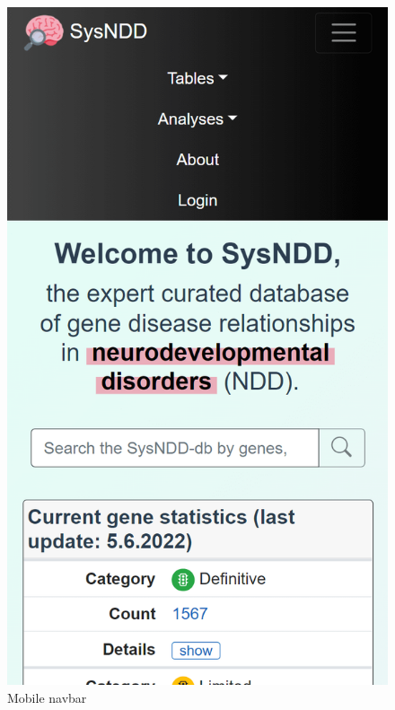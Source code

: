 \documentclass[
]{article}
\begin{document}
\begin{figure}
\centering
\includegraphics{./static/img/02_20-mobile-navbar.png}
\caption{Mobile navbar}
\end{figure}
\end{document}
